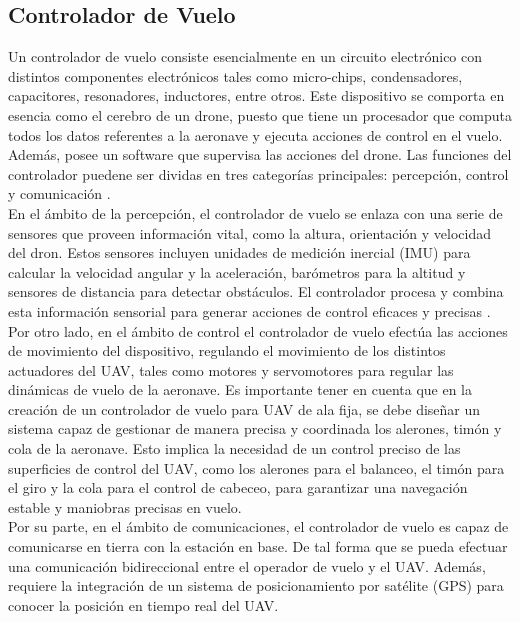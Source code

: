 \subsection{Controlador de Vuelo}
\vspace{5 px}

Un controlador de vuelo consiste esencialmente en un circuito electrónico con distintos componentes electrónicos tales como micro-chips, condensadores, capacitores, resonadores, inductores, entre otros. Este dispositivo se comporta en esencia como el cerebro de un drone, puesto que tiene un procesador que computa todos los datos referentes a la aeronave y ejecuta acciones de control en el vuelo. Además, posee un software que supervisa las acciones del drone. Las funciones del controlador puedene ser dividas en tres categorías principales: percepción, control y comunicación \cite{6}.\\

En el ámbito de la percepción, el controlador de vuelo se enlaza con una serie de sensores que proveen información vital, como la altura, orientación y velocidad del dron. Estos sensores incluyen unidades de medición inercial (IMU) para calcular la velocidad angular y la aceleración, barómetros para la altitud y sensores de distancia para detectar obstáculos. El controlador procesa y combina esta información sensorial para generar acciones de control eficaces y precisas \cite{6}. \\

Por otro lado, en el ámbito de control el controlador de vuelo efectúa las acciones de movimiento del dispositivo, regulando el movimiento de los distintos actuadores del UAV, tales como motores y servomotores para regular las dinámicas de vuelo de la aeronave. Es importante tener en cuenta que en la creación de un controlador de vuelo para UAV de ala fija, se debe diseñar un sistema capaz de gestionar de manera precisa y coordinada los alerones, timón y cola de la aeronave. Esto implica la necesidad de un control preciso de las superficies de control del UAV, como los alerones para el balanceo, el timón para el giro y la cola para el control de cabeceo, para garantizar una navegación estable y maniobras precisas en vuelo. \\

Por su parte, en el ámbito de comunicaciones, el controlador de vuelo es capaz de comunicarse en tierra con la estación en base. De tal forma que se pueda efectuar una comunicación bidireccional entre el operador de vuelo y el UAV. Además, requiere la integración de un sistema de posicionamiento por satélite (GPS) para conocer la posición en tiempo real del UAV.\\

